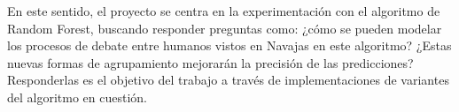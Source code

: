 En este sentido, el proyecto se centra en la experimentación con el algoritmo de Random Forest, buscando responder preguntas como: ¿cómo se pueden modelar los procesos de debate entre humanos vistos en Navajas en este algoritmo? ¿Estas nuevas formas de agrupamiento mejorarán la precisión de las predicciones? Responderlas es el objetivo del trabajo a través de implementaciones de variantes del algoritmo en cuestión.
